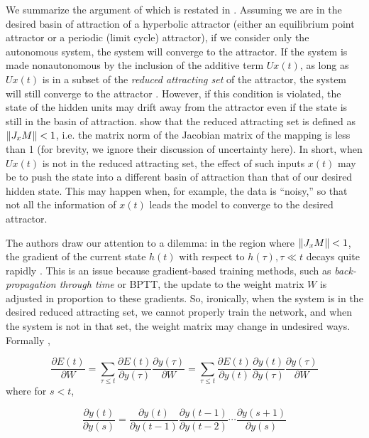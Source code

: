 We summarize the argument of \citealt{DBLP:journals/tnn/BengioSF94} which is restated in \citealt{Hochreiter2001}. Assuming we are in the desired basin of attraction of a hyperbolic attractor (either an equilibrium point attractor or a periodic (limit cycle) attractor), if we consider only the autonomous system, the system will converge to the attractor. If the system is made nonautonomous by the inclusion of the additive term $Ux(t)$, as long as $Ux(t)$ is in a subset of the \emph{reduced attracting set} of the attractor, the system will still converge to the attractor \cite[p. 160]{DBLP:journals/tnn/BengioSF94}. However, if this condition is violated, the state of the hidden units may drift away from the attractor even if the state is still in the basin of attraction. \citeauthor*{DBLP:journals/tnn/BengioSF94} show that the reduced attracting set is defined as $\left\lVert J_x M \right\rVert < 1$, i.e. the matrix norm of the Jacobian matrix of the mapping is less than 1 (for brevity, we ignore their discussion of uncertainty here). In short, when $Ux(t)$ is not in the reduced attracting set, the effect of such inputs $x(t)$ may be to push the state into a different basin of attraction than that of our desired hidden state. This may happen when, for example, the data is ``noisy,'' so that not all the information of $x(t)$ leads the model to converge to the desired attractor.

The authors draw our attention to a dilemma: in the region where $\left\lVert J_x M \right\rVert < 1$, the gradient of the current state $h(t)$ with respect to $h(\tau), \tau \ll t$ decays quite rapidly \cite{Hochreiter2001}. This is an issue because gradient-based training methods, such as \emph{back-propagation through time} or BPTT, the update to the weight matrix $W$ is adjusted in proportion to these gradients. So, ironically, when the system is in the desired reduced attracting set, we cannot properly train the network, and when the system is not in that set, the weight matrix may change in undesired ways. Formally \cite{Hochreiter2001},

\begin{equation*}
  \frac{\partial E(t)}{\partial W} = \sum_{\tau \leq t} \frac{\partial E(t)}{\partial y(\tau)} \frac{\partial y(\tau)}{\partial W} = \sum_{\tau \leq t} \frac{\partial E(t)}{\partial y(t)} \frac{\partial y(t)}{\partial y(\tau)} \frac{\partial y(\tau)}{\partial W}
\end{equation*}
%
where for $s < t$,

\begin{equation*}
\frac{\partial y(t)}{\partial y(s)} = \frac{\partial y(t)}{\partial y(t-1)} \frac{\partial y(t-1)}{\partial y(t-2)} \cdots \frac{\partial y(s+1)}{\partial y(s)}
\end{equation*}

